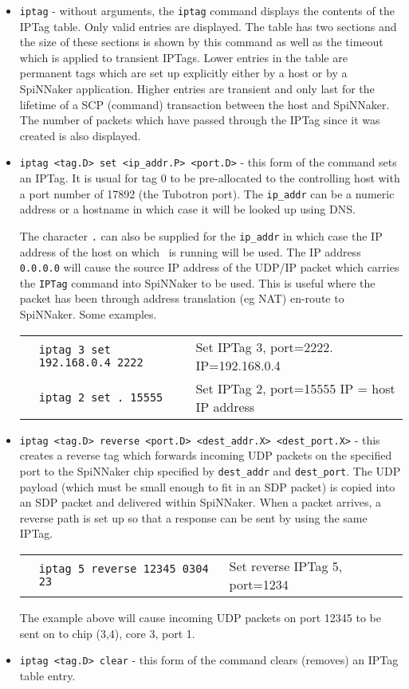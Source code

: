 \begin{itemize}

\item
\texttt{iptag} - without arguments, the \texttt{iptag} command displays
the contents of the IPTag table. Only valid entries are displayed. The
table has two sections and the size of these sections is shown by this
command as well as the timeout which is applied to transient IPTags.
Lower entries in the table are permanent tags which are set up
explicitly either by a host or by a SpiNNaker application. Higher
entries are transient and only last for the lifetime of a SCP (command)
transaction between the host and SpiNNaker. The number of packets which
have passed through the IPTag since it was created is also displayed.

\item
\texttt{iptag <tag.D> set <ip\_addr.P> <port.D>} - this form of the
command sets an IPTag. It is usual for tag 0 to be pre-allocated
to the controlling host with a port number of 17892 (the Tubotron port).
The \texttt{ip\_addr} can be a numeric address or a hostname
in which case it will be looked up using DNS.

The character \texttt{.} can also be supplied for the \texttt{ip\_addr}
in which case the IP address of the host on which \ybug\ is running will
be used. The IP address \texttt{0.0.0.0} will cause the source IP
address of the UDP/IP packet which carries the \texttt{IPTag} command
into SpiNNaker to be used. This is useful where the packet has been
through address translation (eg NAT) en-route to SpiNNaker. Some examples.

\begin{tabular}{p{0.5cm} p{6cm} l}
& \texttt{iptag 3 set 192.168.0.4 2222} & Set IPTag 3, port=2222. IP=192.168.0.4 \\
& \texttt{iptag 2 set . 15555} & Set IPTag 2, port=15555 IP = host IP address \\
\end{tabular}

\item
\texttt{iptag <tag.D> reverse <port.D> <dest\_addr.X> <dest\_port.X>} -
this creates a reverse tag which forwards incoming UDP packets on the
specified port to the SpiNNaker chip specified by \texttt{dest\_addr}
and \texttt{dest\_port}. The UDP payload (which must be small enough
to fit in an SDP packet) is copied into an SDP packet and delivered
within SpiNNaker. When a packet arrives, a reverse path is set up so
that a response can be sent by using the same IPTag.

\begin{tabular}{p{0.5cm} p{6cm} l}
& \texttt{iptag 5 reverse 12345 0304 23} & Set reverse IPTag 5, port=1234
\end{tabular}

The example above will cause incoming UDP packets on port 12345 to be
sent on to chip (3,4), core 3, port 1.

\item
\texttt{iptag <tag.D> clear} - this form of the command clears (removes) an
IPTag table entry.

\end{itemize}

